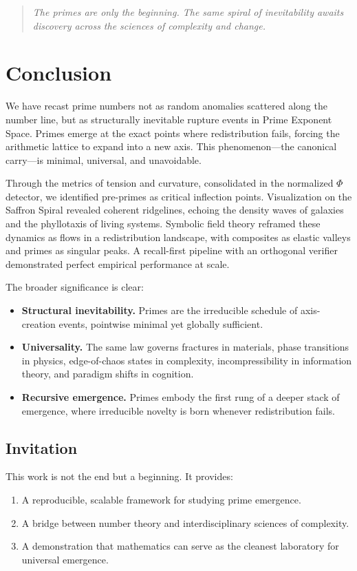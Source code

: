 \documentclass[11pt]{article}
\theoremstyle{plain}
\theoremstyle{definition}
\begin{document}
\begin{quote}
\emph{The primes are only the beginning. The same spiral of inevitability  
awaits discovery across the sciences of complexity and change.}
\end{quote}

\section{Conclusion}

We have recast prime numbers not as random anomalies scattered along the number line, but as structurally inevitable rupture events in Prime Exponent Space. Primes emerge at the exact points where redistribution fails, forcing the arithmetic lattice to expand into a new axis. This phenomenon—the canonical carry—is minimal, universal, and unavoidable.

Through the metrics of tension and curvature, consolidated in the normalized $\Phi$ detector, we identified pre-primes as critical inflection points. Visualization on the Saffron Spiral revealed coherent ridgelines, echoing the density waves of galaxies and the phyllotaxis of living systems. Symbolic field theory reframed these dynamics as flows in a redistribution landscape, with composites as elastic valleys and primes as singular peaks. A recall-first pipeline with an orthogonal verifier demonstrated perfect empirical performance at scale.

The broader significance is clear:
\begin{itemize}
  \item \textbf{Structural inevitability.} Primes are the irreducible schedule of axis-creation events, pointwise minimal yet globally sufficient.
  \item \textbf{Universality.} The same law governs fractures in materials, phase transitions in physics, edge-of-chaos states in complexity, incompressibility in information theory, and paradigm shifts in cognition.
  \item \textbf{Recursive emergence.} Primes embody the first rung of a deeper stack of emergence, where irreducible novelty is born whenever redistribution fails.
\end{itemize}

\subsection*{Invitation}
This work is not the end but a beginning. It provides:
\begin{enumerate}
  \item A reproducible, scalable framework for studying prime emergence.  
  \item A bridge between number theory and interdisciplinary sciences of complexity.  
  \item A demonstration that mathematics can serve as the cleanest laboratory for universal emergence.  
\end{enumerate}
\end{document}
